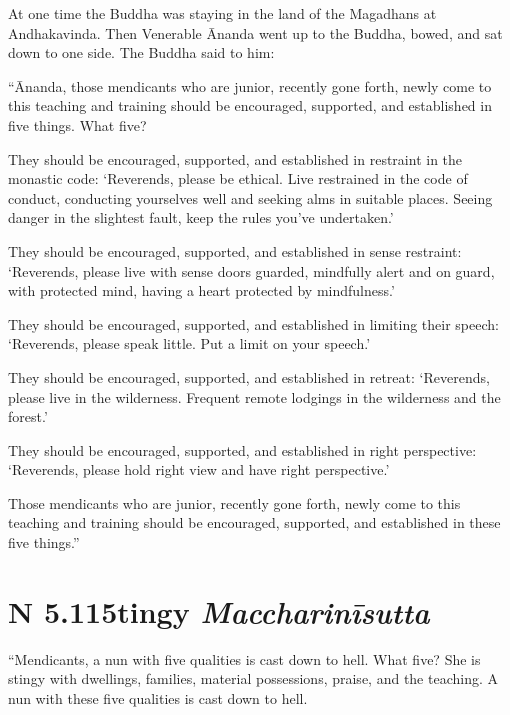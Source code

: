 \documentclass[12pt,openany]{book}%
\newcommand*{\suttatitleacronym}[1]{\smaller[2]{#1}\vspace*{.3em}}
\newcommand*{\suttatitletranslation}[1]{\linebreak{#1}}
\newcommand*{\suttatitleroot}[1]{\linebreak\smaller[2]\itshape{#1}}
\newcommand*{\tocacronym}[1]{\hspace*{-3.3em}{#1}\quad}
\newcommand*{\toctranslation}[1]{#1}
\newcommand*{\tocroot}[1]{(\textit{#1})}
\begin{document}
At one time the Buddha was staying in the land of the Magadhans at Andhakavinda. Then Venerable Ānanda went up to the Buddha, bowed, and sat down to one side. The Buddha said to him: 

“Ānanda, those mendicants who are junior, recently gone forth, newly come to this teaching and training should be encouraged, supported, and established in five things. What five? 

They should be encouraged, supported, and established in restraint in the monastic code: ‘Reverends, please be ethical. Live restrained in the code of conduct, conducting yourselves well and seeking alms in suitable places. Seeing danger in the slightest fault, keep the rules you’ve undertaken.’ 

They should be encouraged, supported, and established in sense restraint: ‘Reverends, please live with sense doors guarded, mindfully alert and on guard, with protected mind, having a heart protected by mindfulness.’ 

They should be encouraged, supported, and established in limiting their speech: ‘Reverends, please speak little. Put a limit on your speech.’ 

They should be encouraged, supported, and established in retreat: ‘Reverends, please live in the wilderness. Frequent remote lodgings in the wilderness and the forest.’ 

They should be encouraged, supported, and established in right perspective: ‘Reverends, please hold right view and have right perspective.’ 

Those mendicants who are junior, recently gone forth, newly come to this teaching and training should be encouraged, supported, and established in these five things.” 

%
\section*{{\suttatitleacronym AN 5.115}{\suttatitletranslation Stingy }{\suttatitleroot Maccharinīsutta}}
\addcontentsline{toc}{section}{\tocacronym{AN 5.115} \toctranslation{Stingy } \tocroot{Maccharinīsutta}}

“Mendicants, a nun with five qualities is cast down to hell. What five? She is stingy with dwellings, families, material possessions, praise, and the teaching. A nun with these five qualities is cast down to hell. 
\end{document}
